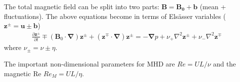 The total magnetic field can be split into two parts: $ \mathbf{B} = \mathbf{B_0} + \mathbf{b} $ (mean + fluctuations). The above equations become in terms of Els\"asser variables ($\mathbf{z}^{\pm} =  \mathbf{u} \pm \mathbf{b} $) 
\begin{eqnarray}
\frac{\partial {\mathbf{z}^{\pm}}}{\partial t}\mp\left(\mathbf {B}_0\cdot{\mathbf \nabla}\right){\mathbf z^{\pm}} + \left({\mathbf z^{\mp}}\cdot{\mathbf \nabla}\right){\mathbf z^{\pm}} = -{\mathbf \nabla}p 
+ \nu_+ \nabla^2 \mathbf{z}^{\pm} + \nu_- \nabla^2 \mathbf{z}^{\mp} 
\end{eqnarray}
where $ \nu_\pm = \nu \pm \eta $.

The important non-dimensional parameters for MHD are $Re = U L /\nu $ and the magnetic Re $ Re_M = U L /\eta $.

